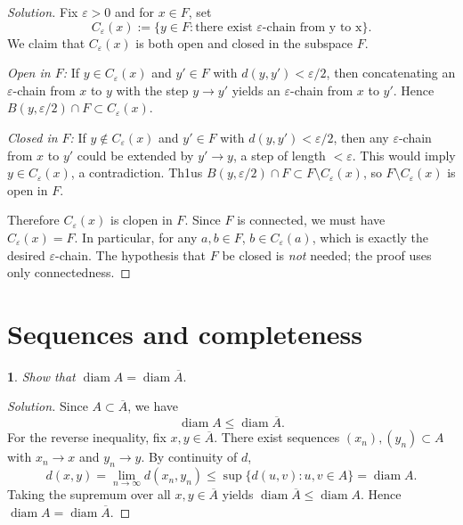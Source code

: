 \documentclass[12pt, a4paper]{report}
\theoremstyle{spaced}
\newtheorem{exercise}{}
\newcommand{\setexercise}[1]{\setcounter{exercise}{#1-1}}
\begin{document}
\begin{proof}[Solution]
	Fix $\varepsilon > 0$ and	for $x \in F$, set
	\[
		C_\varepsilon(x) := \{y \in F : \text{there exist $\varepsilon$-chain from y to x}\}.
	\]
	We claim that $C_\varepsilon(x)$ is both open and closed in the subspace $F$.

	\medskip
	\noindent
	\emph{Open in $F$:}
	If $y \in C_\varepsilon(x)$ and $y' \in F$ with $d(y,y') < \varepsilon/2$, then
	concatenating an $\varepsilon$-chain from $x$ to $y$ with the step $y \to y'$
	yields an $\varepsilon$-chain from $x$ to $y'$.
	Hence $B(y,\varepsilon/2) \cap F \subset C_\varepsilon(x)$.

	\medskip
	\noindent
	\emph{Closed in $F$:}
	If $y \notin C_\varepsilon(x)$ and $y' \in F$ with $d(y,y') < \varepsilon/2$, then
	any $\varepsilon$-chain from $x$ to $y'$ could be extended by $y' \to y$, a step of
	length $< \varepsilon$. This would imply $y \in C_\varepsilon(x)$, a contradiction.
	Th1us $B(y,\varepsilon/2) \cap F \subset F \setminus C_\varepsilon(x)$, so
	$F \setminus C_\varepsilon(x)$ is open in $F$.

	\medskip
	Therefore $C_\varepsilon(x)$ is clopen in $F$. Since $F$ is connected, we must have
	$C_\varepsilon(x) = F$. In particular, for any $a,b \in F$, $b \in C_\varepsilon(a)$,
	which is exactly the desired $\varepsilon$-chain.
	The hypothesis that $F$ be closed is \emph{not} needed; the proof uses only connectedness.

\end{proof}

\section{Sequences and completeness}

\setexercise{3}
\begin{exercise}
	Show that
	\(
	\operatorname{diam} A = \operatorname{diam} \overline{A}.
	\)
\end{exercise}


\begin{proof}[Solution]
	Since $A\subset\overline{A}$, we have
	\[
		\operatorname{diam}A\le \operatorname{diam}\overline{A}.
	\]
	For the reverse inequality, fix $x,y\in\overline{A}$. There exist sequences
	$(x_n),(y_n)\subset A$ with $x_n\to x$ and $y_n\to y$. By continuity of $d$,
	\[
		d(x,y)=\lim_{n\to\infty} d(x_n,y_n)\le \sup\{d(u,v):u,v\in A\}
		= \operatorname{diam}A.
	\]
	Taking the supremum over all $x,y\in\overline{A}$ yields
	$\operatorname{diam}\overline{A}\le \operatorname{diam}A$.
	Hence $\operatorname{diam}A=\operatorname{diam}\overline{A}$.
\end{proof}
\end{document}
